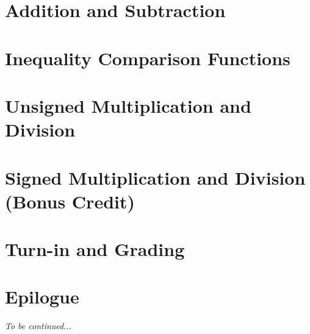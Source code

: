 \section{Addition and Subtraction}                                                                      

\section{Inequality Comparison Functions}\label{sec:inequality-comparison}                              

\section{Unsigned Multiplication and Division}                                                          

\section{Signed Multiplication and Division (Bonus Credit)}                                             

\section{Turn-in and Grading}                                                                           

\section*{Epilogue}                                                                                     \SuccessfulALU

\textit{To be continued...}


